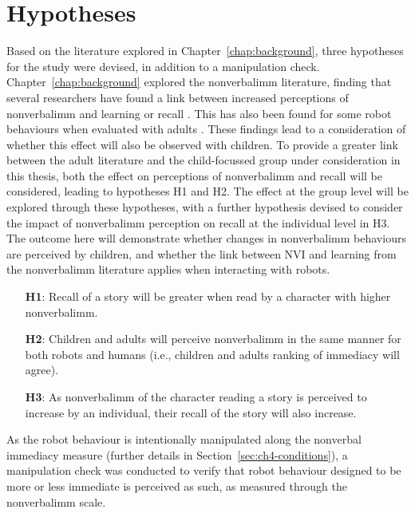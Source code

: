 \section{Hypotheses}
Based on the literature explored in Chapter~\ref{chap:background}, three hypotheses for the study were devised, in addition to a manipulation check. Chapter~\ref{chap:background} explored the \gls{nonverbalimm} literature, finding that several researchers have found a link between increased perceptions of \gls{nonverbalimm} and learning or recall \citep{comstock1995food,mccroskey1996nonverbal,witt2004meta}. This has also been found for some robot behaviours when evaluated with adults \citep{szafir2012pay}. These findings lead to a consideration of whether this effect will also be observed with children. To provide a greater link between the adult literature and the child-focussed group under consideration in this thesis, both the effect on perceptions of \gls{nonverbalimm} and recall will be considered, leading to hypotheses H1 and H2. The effect at the group level will be explored through these hypotheses, with a further hypothesis devised to consider the impact of \gls{nonverbalimm} perception on recall at the individual level in H3. The outcome here will demonstrate whether changes in \gls{nonverbalimm} behaviours are perceived by children, and whether the link between NVI and learning from the \gls{nonverbalimm} literature applies when interacting with robots.
\begin{itemize}
	\item [\textbf{H1}:] Recall of a story will be greater when read by a character with higher \gls{nonverbalimm}.
	\item [\textbf{H2}:] Children and adults will perceive \gls{nonverbalimm} in the same manner for both robots and humans (i.e., children and adults ranking of immediacy will agree).
	\item [\textbf{H3}:] As \gls{nonverbalimm} of the character reading a story is perceived to increase by an individual, their recall of the story will also increase.
\end{itemize}

As the robot behaviour is intentionally manipulated along the nonverbal immediacy measure (further details in Section~\ref{sec:ch4-conditions}), a manipulation check was conducted to verify that robot behaviour designed to be more or less immediate is perceived as such, as measured through the \gls{nonverbalimm} scale.

